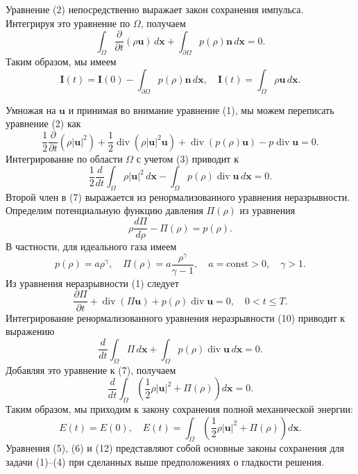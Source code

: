 \documentclass[10pt,twocolumn]{article}
\begin{document}
Уравнение (2) непосредственно выражает закон сохранения импульса. Интегрируя это уравнение по \(\Omega\), получаем
\[
\int_{\Omega}\frac{\partial}{\partial t} (\rho \mathbf{u})\,d\mathbf{x} + \int_{\partial \Omega}p(\rho)\mathbf{n}\,d\mathbf{x} = 0.
\]
Таким образом, мы имеем
\begin{equation}
\mathbf {I}(t) = \mathbf {I}(0) - \int_{\partial \Omega}p(\rho)\mathbf {n}\,d\mathbf {x},\quad \mathbf {I}(t) = \int_{\Omega}\rho \mathbf {u}\,d\mathbf {x}. \tag{6}
\end{equation}

Умножая на \(\mathbf{u}\) и принимая во внимание уравнение (1), мы можем переписать уравнение (2) как
\[
\frac{1}{2}\frac{\partial}{\partial t} (\rho |\mathbf{u}|^{2}) + \frac{1}{2}\operatorname{div}(\rho |\mathbf{u}|^{2}\mathbf{u}) + \operatorname{div}(p(\rho)\mathbf{u}) - p\operatorname{div}\mathbf{u} = 0.
\]
Интегрирование по области \(\Omega\) с учетом (3) приводит к
\begin{equation}
\frac{1}{2}\frac{d}{dt}\int_{\Omega}\rho |\mathbf{u}|^{2}\,d\mathbf{x} - \int_{\Omega}p(\rho)\operatorname{div}\mathbf{u}\,d\mathbf{x} = 0. \tag{7}
\end{equation}
Второй член в (7) выражается из ренормализованного уравнения неразрывности. Определим потенциальную функцию давления \(\Pi (\rho)\) из уравнения
\begin{equation}
\rho \frac{d\Pi}{d\rho} -\Pi (\rho) = p(\rho). \tag{8}
\end{equation}
В частности, для идеального газа имеем
\begin{equation}
p(\rho) = a\rho^{\gamma},\quad \Pi (\rho) = a\frac{\rho^{\gamma}}{\gamma - 1},\quad a = \mathrm{const} > 0,\quad \gamma >1. \tag{9}
\end{equation}
Из уравнения неразрывности (1) следует
\begin{equation}
\frac{\partial\Pi}{\partial t} +\operatorname{div}(\Pi \mathbf {u}) + p(\rho)\operatorname{div}\mathbf {u} = 0,\quad 0< t\leq T. \tag{10}
\end{equation}
Интегрирование ренормализованного уравнения неразрывности (10) приводит к выражению
\[
\frac{d}{dt}\int_{\Omega}\Pi\,d\mathbf {x} + \int_{\Omega}p(\rho)\operatorname{div}\mathbf {u}\,d\mathbf {x} = 0.
\]
Добавляя это уравнение к (7), получаем
\begin{equation}
\frac{d}{dt}\int_{\Omega}\left(\frac{1}{2}\rho |\mathbf {u}|^{2} + \Pi (\rho)\right)d\mathbf {x} = 0. \tag{11}
\end{equation}
Таким образом, мы приходим к закону сохранения полной механической энергии:
\begin{equation}
E(t) = E(0),\quad E(t) = \int_{\Omega}\left(\frac{1}{2}\rho |\mathbf {u}|^{2} + \Pi (\rho)\right)d\mathbf {x}. \tag{12}
\end{equation}
Уравнения (5), (6) и (12) представляют собой основные законы сохранения для задачи (1)--(4) при сделанных выше предположениях о гладкости решения.
\end{document}
